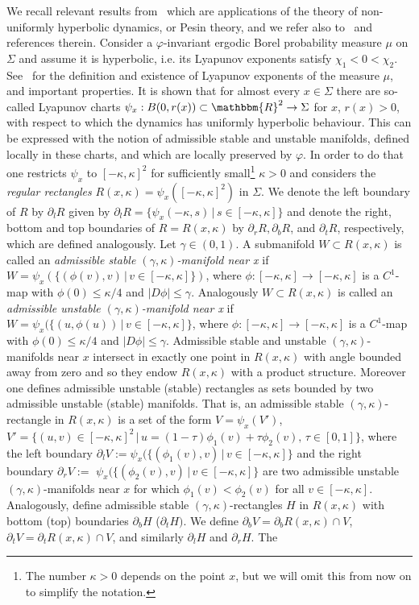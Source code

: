 \documentclass[10pt,a4paper]{amsart}
\numberwithin{equation}{section}
\newcommand{\R}{\mathbbm{R}}
\theoremstyle{definition}
\theoremstyle{remark}
\begin{document}
We recall relevant results from~\cite[Suppl.]{Hasselblatt-Katok} which are applications of the theory of non-uniformly hyperbolic dynamics, or Pesin theory, and we refer also to~\cite{BarreiraPesin} and references therein. Consider a $\varphi$-invariant ergodic Borel probability measure $\mu$ on $\Sigma$ and assume it is hyperbolic, i.e. its Lyapunov exponents satisfy $\chi_1< 0< \chi_2$. See~\cite[Suppl., Section~2]{Hasselblatt-Katok} for the definition and existence of Lyapunov exponents of the measure $\mu$, and important properties. It is shown that for almost every $x \in \Sigma$ there are so-called Lyapunov charts $\psi_x: B(0,r(x)) \subset \R^2 \to \Sigma$ for $x$, $r(x)>0$, with respect to which the dynamics has uniformly hyperbolic behaviour. This can be expressed with the notion of admissible stable and unstable manifolds, defined locally in these charts, and which are locally preserved by $\varphi$. In order to do that one restricts $\psi_x$ to $[-\kappa,\kappa]^2$ for sufficiently small\footnote{The number $\kappa>0$ depends on the point $x$, but we will omit this from now on to simplify the notation.} $\kappa>0$ and considers the \emph{regular rectangles} $R(x,\kappa) = \psi_x([-\kappa,\kappa]^2)$ in $\Sigma$. We denote the left boundary of $R$ by $\partial_l R$ given by $\partial_l R = \{ \psi_x(-\kappa, s) \, | \, s \in [-\kappa, \kappa]\}$ and denote the right, bottom and top boundaries of $R= R(x,\kappa)$ by $\partial_r R, \partial_b R$, and $\partial_t R$, respectively, which are defined analogously. Let $\gamma \in (0,1)$. A submanifold $W \subset R(x,\kappa)$ is called an \emph{admissible stable $(\gamma,\kappa)$-manifold near x} if $W= \psi_x(\{(\phi(v),v)\, |\, v\in [-\kappa,\kappa]\})$, where $\phi:[-\kappa,\kappa] \to [-\kappa,\kappa]$ is a $C^1$-map with $\phi(0) \leq \kappa/4$ and $|D\phi| \leq \gamma$. Analogously $W \subset R(x,\kappa)$ is called an \emph{admissible unstable $(\gamma,\kappa)$-manifold near x} if $W= \psi_x(\{(u,\phi(u))\, |\, v\in [-\kappa,\kappa]\}$, where $\phi:[-\kappa,\kappa] \to [-\kappa,\kappa]$ is a $C^1$-map with $\phi(0) \leq \kappa/4$ and $|D\phi| \leq \gamma$. Admissible stable and unstable $(\gamma,\kappa)$-manifolds near $x$ intersect in exactly one point in $R(x,\kappa)$ with angle bounded away from zero and so they endow $R(x,\kappa)$ with a product structure. Moreover one defines admissible unstable (stable) rectangles as sets bounded by two admissible unstable (stable) manifolds. That is, an admissible stable $(\gamma,\kappa)$-rectangle in $R(x,\kappa)$ is a set of the form $V=\psi_x(V')$, $V'= \{(u,v) \in [-\kappa,\kappa]^2 \, | \, u = (1-\tau) \phi_1(v) + \tau \phi_2(v), \, \tau \in [0,1]\}$, where the left boundary $\partial_l V := \psi_x(\{(\phi_1(v),v)\, |\, v\in [-\kappa,\kappa]\}$ and the right boundary $\partial_r V:=$ $\psi_x(\{(\phi_2(v),v)\, |\, v\in [-\kappa,\kappa]\}$ are two admissible unstable $(\gamma,\kappa)$-manifolds near $x$ for which $\phi_1(v) < \phi_2(v)$ for all $v\in [-\kappa, \kappa]$. Analogously, define admissible stable $(\gamma,\kappa)$-rectangles $H$ in $R(x,\kappa)$ with bottom (top) boundaries $\partial_b H$ ($\partial_t H)$. We define $\partial_b V = \partial_b R(x,\kappa) \cap V$, $\partial_t V = \partial_t R(x,\kappa) \cap V$, and similarly $\partial_l H$ and $\partial_r H$. The 
\end{document}
